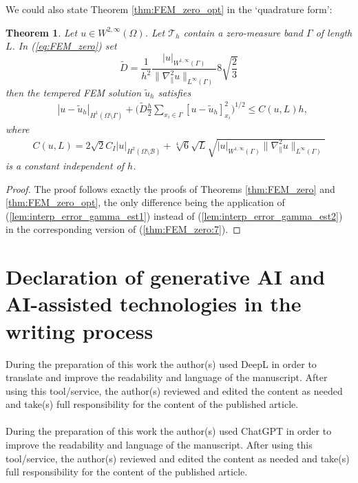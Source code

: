 \documentclass{article}
\newtheorem{theorem}[lemma]{Theorem}
\theoremstyle{remark}
\def \Th {{\mathcal T}_h}
\def\B{\mathcal{B}}
\def\WIi{W^{1,\infty}}
\def\WIIi{W^{2,\infty}}
\def\tu{\tilde{u}}
\def\gradt{\nabla_{\!\!{\scriptscriptstyle\parallel}}}
\def\tD{\widetilde{D}}
\begin{document}
We could also state Theorem \ref{thm:FEM_zero_opt} in the `quadrature form':

\begin{theorem}
\label{thm:FEM_zero_opt2}
Let $u\in \WIIi(\Omega)$. Let $\Th$ contain a zero-measure band $\Gamma$ of length $L$. In (\ref{eq:FEM_zero}) set 
\begin{equation}
\label{thm:FEM_zero_opt2:D}
\tD=\frac{1}{h^2}\frac{|u|_{\WIi(\Gamma)}}{\|\gradt^2 u\|_{L^\infty(\Gamma)}}8\sqrt{\frac{2}{3}}\end{equation}
then the tempered FEM solution $\tu_h$ satisfies
\begin{equation}
\begin{split}
\label{thm:FEM_zero_opt2:est}
&|u-\tu_h|_{H^1(\Omega\setminus\Gamma)} +\bigg(\tD\frac{h}{2}\sum_{x_i\in\Gamma}[u-\tu_h]_{x_i}^2 \bigg)^{1/2}\leq C(u,L)h,
\end{split}
\end{equation}
where
\begin{equation}
\begin{split}
\label{thm:FEM_zero_opt2:est2}
C(u,L)=2\sqrt{2}C_I|u|_{H^2(\Omega\setminus\B)} + \sqrt[4]{6}\sqrt{L} \sqrt{|u|_{\WIi(\Gamma)}\|\gradt^2 u\|_{L^\infty(\Gamma)}}
\end{split}
\end{equation}
is a constant independent of $h$.
\end{theorem}
\begin{proof}
The proof follows exactly the proofs of Theorems \ref{thm:FEM_zero} and \ref{thm:FEM_zero_opt}, the only difference being the application of (\ref{lem:interp_error_gamma_est1}) instead of (\ref{lem:interp_error_gamma_est2}) in the corresponding version of (\ref{thm:FEM_zero:7}).
\end{proof}
\vspace{0.5cm}

\section*{Declaration of generative AI and AI-assisted technologies in the writing process}
During the preparation of this work the author(s) used DeepL in order to translate and improve the readability and language of the manuscript. After using this tool/service, the author(s) reviewed and edited the content as needed and
take(s) full responsibility for the content of the published article. \\ \\
During the preparation of this work the author(s) used ChatGPT in order to improve the readability and language of the manuscript. After using this tool/service, the author(s) reviewed and edited the content as needed and
take(s) full responsibility for the content of the published article.

 

 
\end{document}
